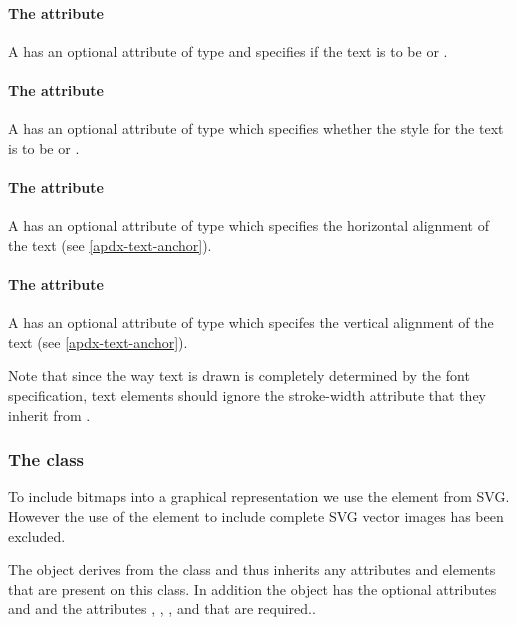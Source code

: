 \paragraph{The \fixttspace{} attribute}

A \Text has an optional attribute  of type
\FontWeight and specifies if the text is to be  or .

\paragraph{The \fixttspace{} attribute}

A \Text has an optional attribute  of type \FontStyle which specifies whether the style for the text is to be  or .

\paragraph{The \fixttspace{} attribute}

A \Text has an optional attribute  of type
\HTextAnchor which specifies the horizontal alignment of the text (see \ref{apdx-text-anchor}).

\paragraph{The \fixttspace{} attribute}

A \Text has an optional attribute  of type
\VTextAnchor which specifes the vertical alignment of the text (see \ref{apdx-text-anchor}).

Note that since the way text is drawn is completely determined by the font specification, text elements should ignore the stroke-width attribute that they inherit from \GraphicalPrimitiveOneD.

\subsubsection{The  class}
\label{image-class}

To include bitmaps into a graphical representation we use the \Image element 
from SVG. However the use of the \Image element to include complete SVG 
vector images has been excluded.


The \Image object derives from the \TransformationTwoD class and thus
inherits any attributes and elements that are present on this class.
In addition the \Image object has the optional attributes  and  and the attributes , , ,  and  that are required..

